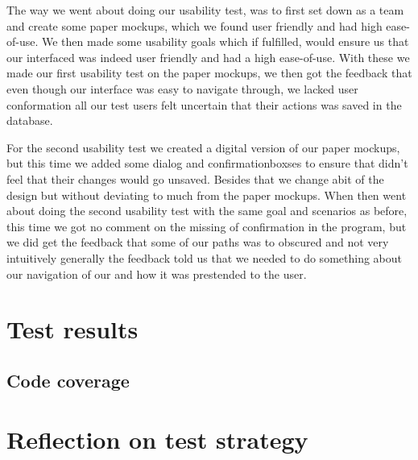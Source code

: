 The way we went about doing our usability test, was to first set down as a team and create some paper mockups, which we found user friendly and had high ease-of-use. We then made some usability goals which if fulfilled, would ensure us that our interfaced was indeed user friendly and had a high ease-of-use. With these we made our first usability test on the paper mockups, we then got the feedback that even though our interface was easy to navigate through, we lacked user conformation all our test users felt uncertain that their actions was saved in the database.

For the second usability test we created a digital version of our paper mockups, but this time we added some dialog and confirmationboxses to ensure that didn't feel that their changes would go unsaved. Besides that we change abit of the design but without deviating to much from the paper mockups. When then went about doing the second usability test with the same goal and scenarios as before, this time we got no comment on the missing of confirmation in the program, but we did get the feedback that some of our paths was to obscured and not very intuitively generally the feedback told us that we needed to do something about our navigation of our and how it was prestended to the user.


\section{Test results}
\label{Testing_Results}

\subsection{Code coverage}
\label{Testing_Results_Coverage}

\section{Reflection on test strategy}
\label{Testing_Reflection}

